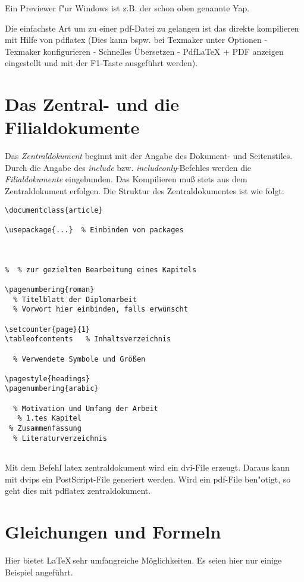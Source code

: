 Ein Previewer f"ur Windows ist z.B. der schon oben genannte Yap.

Die einfachste Art um zu einer pdf-Datei zu gelangen ist das direkte kompilieren mit Hilfe von pdflatex (Dies kann bspw. bei Texmaker unter Optionen - Texmaker konfigurieren - Schnelles Übersetzen - PdfLaTeX + PDF anzeigen eingestellt und mit der F1-Taste ausgeführt werden).



\section{Das Zentral- und die Filialdokumente}
Das {\it Zentraldokument} beginnt mit der Angabe des Dokument- und
Seitenstiles.  Durch die Angabe des {\it include} bzw.
{\it includeonly}-Befehles werden die {\it Filialdokumente} eingebunden. Das Kompilieren muß
stets aus dem Zentraldokument erfolgen. Die Struktur des Zentraldokumentes ist
wie folgt:

{\footnotesize
\begin{verbatim}
\documentclass{article}

\usepackage{...}  % Einbinden von packages



%  % zur gezielten Bearbeitung eines Kapitels

\pagenumbering{roman}
  % Titelblatt der Diplomarbeit
  % Vorwort hier einbinden, falls erwünscht

\setcounter{page}{1}
\tableofcontents   % Inhaltsverzeichnis

  % Verwendete Symbole und Größen

\pagestyle{headings}
\pagenumbering{arabic}

  % Motivation und Umfang der Arbeit
   % 1.tes Kapitel
 % Zusammenfassung
  % Literaturverzeichnis


\end{verbatim}
}

Mit dem Befehl {\sf latex zentraldokument} wird ein dvi-File
erzeugt. Daraus kann mit {\sf dvips} ein PostScript-File generiert
werden. Wird ein pdf-File ben"otigt, so geht dies mit {\sf pdflatex zentraldokument}.   

\section{Gleichungen und Formeln}
Hier bietet \LaTeX\,sehr umfangreiche Möglichkeiten.  Es seien hier nur einige
Beispiel angeführt.  
\\

